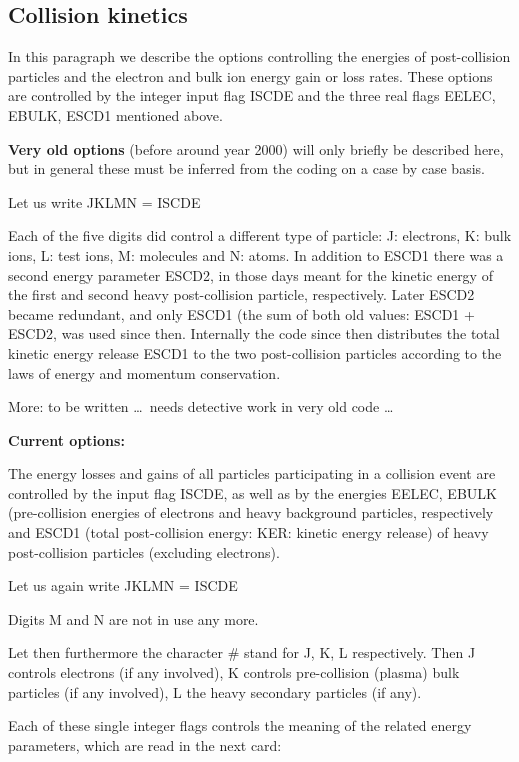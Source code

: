 \subsection{Collision kinetics}

In this paragraph we describe the options controlling the energies of
post-collision particles and the electron and bulk ion energy gain or loss
rates.
These options are controlled by the integer input flag ISCDE and the three real
flags EELEC, EBULK, ESCD1 mentioned above.

\textbf{Very old options} (before around year 2000) will only briefly be
described here, but in general these must be inferred from the coding on a case
by case basis.

Let us write JKLMN = ISCDE

Each of the five digits did control a different type of particle: J: electrons,
K: bulk ions, L: test ions, M: molecules and N: atoms.
In addition to ESCD1 there was a second energy parameter ESCD2, in those days
meant for the kinetic energy of the first and second heavy post-collision
particle, respectively.
Later ESCD2 became redundant, and only ESCD1 (the sum of both old values: ESCD1
+ ESCD2,	was used since then.
Internally the code since then distributes the total kinetic energy release
ESCD1 to the two post-collision particles according to the laws of energy and
momentum conservation.

More: to be written \dots\ needs detective work in very old code \dots

\textbf{Current options:}

The energy losses and gains of all particles participating in a collision event
are controlled by the input flag ISCDE, as well as by the energies EELEC, EBULK
(pre-collision energies of electrons and heavy background particles,
respectively and ESCD1 (total post-collision energy: KER: kinetic energy
release) of heavy post-collision particles (excluding electrons).

Let us again write JKLMN = ISCDE

Digits M and N are not in use any more.

Let then furthermore the character \# stand for J, K, L respectively.
Then J controls electrons (if any involved), K controls pre-collision (plasma)
bulk particles (if any involved), L the heavy secondary particles (if any).

Each of these single integer flags controls the meaning of the related energy
parameters, which are read in the next card:


